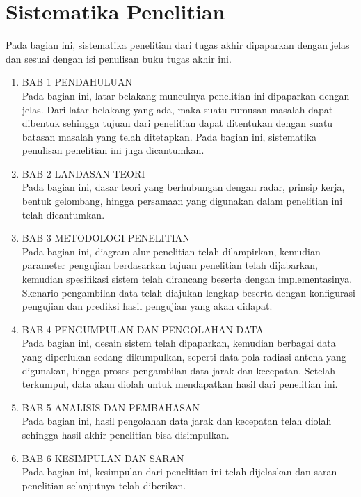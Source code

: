 \section{Sistematika Penelitian}
Pada bagian ini, sistematika penelitian dari tugas akhir dipaparkan dengan jelas dan sesuai dengan isi penulisan buku tugas akhir ini.
\begin{enumerate}
	\item BAB 1 PENDAHULUAN\\
	Pada bagian ini, latar belakang munculnya penelitian ini dipaparkan dengan jelas. Dari latar belakang yang ada, maka suatu rumusan masalah dapat dibentuk sehingga tujuan dari penelitian dapat ditentukan dengan suatu batasan masalah yang telah ditetapkan. Pada bagian ini, sistematika penulisan penelitian ini juga dicantumkan.
	\item BAB 2 LANDASAN TEORI\\
	Pada bagian ini, dasar teori yang berhubungan dengan radar, prinsip kerja, bentuk gelombang, hingga persamaan yang digunakan dalam penelitian ini telah dicantumkan.
	\item BAB 3 METODOLOGI PENELITIAN\\
	Pada bagian ini, diagram alur penelitian telah dilampirkan, kemudian parameter pengujian berdasarkan tujuan penelitian telah dijabarkan, kemudian spesifikasi sistem telah dirancang beserta dengan implementasinya. Skenario pengambilan data telah diajukan lengkap beserta dengan konfigurasi pengujian dan prediksi hasil pengujian yang akan didapat.
	\item BAB 4 PENGUMPULAN DAN PENGOLAHAN DATA\\
	Pada bagian ini, desain sistem telah dipaparkan, kemudian berbagai data yang diperlukan sedang dikumpulkan, seperti data pola radiasi antena yang digunakan, hingga proses pengambilan data jarak dan kecepatan. Setelah terkumpul, data akan diolah untuk mendapatkan hasil dari penelitian ini.
	\item BAB 5 ANALISIS DAN PEMBAHASAN\\
	Pada bagian ini, hasil pengolahan data jarak dan kecepatan telah diolah sehingga hasil akhir penelitian bisa disimpulkan.
	\item BAB 6 KESIMPULAN DAN SARAN\\
	Pada bagian ini, kesimpulan dari penelitian ini telah dijelaskan dan saran penelitian selanjutnya telah diberikan.
\end{enumerate}



